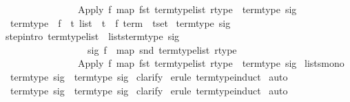 \begin{isabellebody}
\ \ \ \ \ \ \ \ \ \ \ \ \ \ {\isasymLongrightarrow}\ {\isacharparenleft}Apply\ f\ {\isacharparenleft}map\ fst\ term{\isacharunderscore}type{\isacharunderscore}list{\isacharparenright}{\isacharcomma}\ rtype{\isacharparenright}\ {\isasymin}\ term{\isacharunderscore}type\ sig{\isachardoublequote}\isanewline
\isanewline
{}\ term{\isacharunderscore}type{\isacharprime}\ {\isacharcolon}{\isacharcolon}\ {\isachardoublequote}{\isacharparenleft}{\isacharprime}f\ {\isasymRightarrow}\ {\isacharprime}t\ list\ {\isacharasterisk}\ {\isacharprime}t{\isacharparenright}\ {\isasymRightarrow}\ {\isacharparenleft}{\isacharprime}f\ term\ {\isacharasterisk}\ {\isacharprime}t{\isacharparenright}set{\isachardoublequote}\isanewline
{}\ {\isachardoublequote}term{\isacharunderscore}type{\isacharprime}\ sig{\isachardoublequote}\isanewline
{}\isanewline
step{\isacharbrackleft}intro{\isacharbrackright}{\isacharcolon}\ {\isachardoublequote}{\isasymlbrakk}term{\isacharunderscore}type{\isacharunderscore}list\ {\isasymin}\ lists{\isacharparenleft}term{\isacharunderscore}type{\isacharprime}\ sig{\isacharparenright}{\isacharsemicolon}\ \isanewline
\ \ \ \ \ \ \ \ \ \ \ \ \ \ \ \ \ sig\ f\ {\isacharequal}\ {\isacharparenleft}map\ snd\ term{\isacharunderscore}type{\isacharunderscore}list{\isacharcomma}\ rtype{\isacharparenright}{\isasymrbrakk}\isanewline
\ \ \ \ \ \ \ \ \ \ \ \ \ \ {\isasymLongrightarrow}\ {\isacharparenleft}Apply\ f\ {\isacharparenleft}map\ fst\ term{\isacharunderscore}type{\isacharunderscore}list{\isacharparenright}{\isacharcomma}\ rtype{\isacharparenright}\ {\isasymin}\ term{\isacharunderscore}type{\isacharprime}\ sig{\isachardoublequote}\isanewline
{}\ lists{\isacharunderscore}mono\isanewline
\isanewline
\isanewline
{}\ {\isachardoublequote}term{\isacharunderscore}type\ sig\ {\isasymsubseteq}\ term{\isacharunderscore}type{\isacharprime}\ sig{\isachardoublequote}\isanewline
{}\ clarify\isanewline
{}\ {\isacharparenleft}erule\ term{\isacharunderscore}type{\isachardot}induct{\isacharparenright}\isanewline
{}\ auto\isanewline
{}\isanewline
\isanewline
{}\ {\isachardoublequote}term{\isacharunderscore}type{\isacharprime}\ sig\ {\isasymsubseteq}\ term{\isacharunderscore}type\ sig{\isachardoublequote}\isanewline
{}\ clarify\isanewline
{}\ {\isacharparenleft}erule\ term{\isacharunderscore}type{\isacharprime}{\isachardot}induct{\isacharparenright}\isanewline
{}\ auto\isanewline
{}\isanewline
\isanewline
{}\isanewline
\isanewline
\end{isabellebody}%
